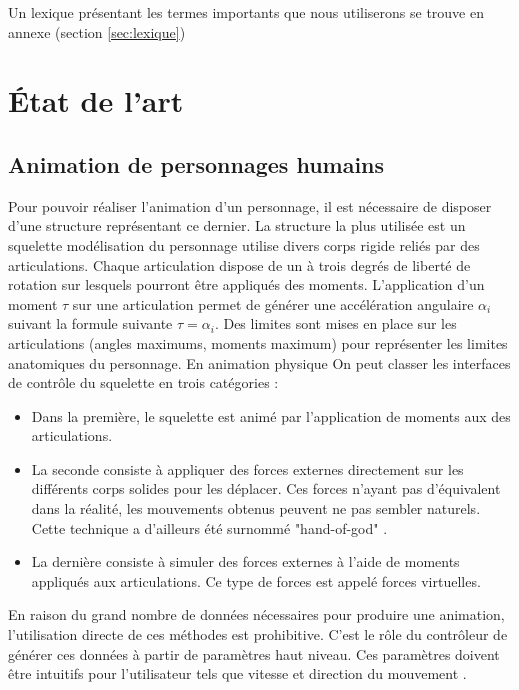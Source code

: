 \documentclass[runningheads,a4paper]{llncs}
\begin{document}
Un lexique présentant les termes importants que nous utiliserons se trouve en annexe (section \ref{sec:lexique})


%
\section{État de l'art}
\label{sec:previous_works}
%
\subsection{Animation de personnages humains} 
Pour pouvoir réaliser l'animation d'un personnage, il est nécessaire de disposer d'une structure représentant ce dernier. La structure la plus utilisée est un squelette modélisation du personnage utilise divers corps rigide reliés par des articulations. Chaque articulation dispose de un à trois degrés de liberté de rotation sur lesquels pourront être appliqués des moments. L'application d'un moment $\tau$ sur une articulation permet de générer une accélération angulaire $\alpha_i$ suivant la formule suivante $\tau=\alpha_i$. Des limites sont mises en place sur les articulations (angles maximums, moments maximum) pour représenter les limites anatomiques du personnage. 
 En animation physique On peut classer les interfaces de contrôle du squelette en trois catégories \cite{geijtenbeek2012interactive}:
\begin{itemize}
\item{Dans la première, le squelette est animé par l'application de moments aux des articulations.}
\item{La seconde consiste à appliquer des forces externes directement sur les différents corps solides pour les déplacer. Ces forces n'ayant pas d'équivalent dans la réalité, les mouvements obtenus peuvent ne pas sembler naturels. Cette technique a d'ailleurs été surnommé "hand-of-god" \cite{van1995guided}. }
\item{La dernière consiste à simuler des forces externes à l'aide de moments appliqués aux articulations. Ce type de forces est appelé forces virtuelles.}
\end{itemize}

En raison du grand nombre de données nécessaires pour produire une animation, l'utilisation directe de ces méthodes est prohibitive. C'est le rôle du contrôleur de générer ces données à partir de paramètres haut niveau. Ces paramètres doivent être intuitifs pour l'utilisateur tels que vitesse et direction du mouvement \cite{coros2010generalized}. 
\end{document}
